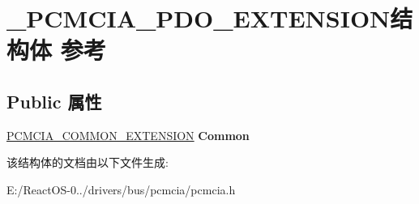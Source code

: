\hypertarget{struct___p_c_m_c_i_a___p_d_o___e_x_t_e_n_s_i_o_n}{}\section{\+\_\+\+P\+C\+M\+C\+I\+A\+\_\+\+P\+D\+O\+\_\+\+E\+X\+T\+E\+N\+S\+I\+O\+N结构体 参考}
\label{struct___p_c_m_c_i_a___p_d_o___e_x_t_e_n_s_i_o_n}
\subsection*{Public 属性}
\begin{DoxyCompactItemize}
\item 
\mbox{\label{struct___p_c_m_c_i_a___p_d_o___e_x_t_e_n_s_i_o_n_a01785fffa11efaf427ca27bd68b8cd59}} 
\hyperlink{struct___p_c_m_c_i_a___c_o_m_m_o_n___e_x_t_e_n_s_i_o_n}{P\+C\+M\+C\+I\+A\+\_\+\+C\+O\+M\+M\+O\+N\+\_\+\+E\+X\+T\+E\+N\+S\+I\+ON} {\bfseries Common}
\end{DoxyCompactItemize}


该结构体的文档由以下文件生成\+:\begin{DoxyCompactItemize}
\item 
E\+:/\+React\+O\+S-\/0../drivers/bus/pcmcia/pcmcia.\+h\end{DoxyCompactItemize}
